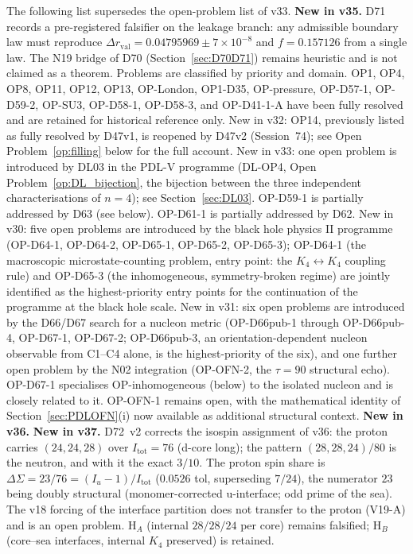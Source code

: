 \documentclass[11pt,a4paper]{article}
\theoremstyle{plain}
\theoremstyle{definition}
\theoremstyle{remark}
\begin{document}
The following list supersedes the open-problem list of v33. \textcolor{negativered}{\textbf{New in v35.}} D71 records a pre-registered falsifier on the leakage branch: any admissible boundary law must reproduce $\Delta r_{\mathrm{val}}=0.04795969\pm7\times10^{-8}$ and $f=0.157126$ from a single law. The N19 bridge of D70 (Section~\ref{sec:D70D71}) remains heuristic and is not claimed as a theorem. Problems are classified by priority and domain. OP1, OP4, OP8, OP11, OP12, OP13, OP-London, OP1-D35, OP-pressure, OP-D57-1, OP-D59-2, OP-SU3, OP-D58-1, OP-D58-3, and OP-D41-1-A have been fully resolved and are retained for historical reference only. \textcolor{negativered}{New in v32: OP14, previously listed as fully resolved by D47v1, is reopened by D47v2 (Session~74); see Open Problem~\ref{op:filling} below for the full account.} New in v33: one open problem is introduced by DL03 in the PDL-V programme (DL-OP4, Open Problem~\ref{op:DL_bijection}, the bijection between the three independent characterisations of $n=4$); see Section~\ref{sec:DL03}. OP-D59-1 is partially addressed by D63 (see below). OP-D61-1 is partially addressed by D62. New in v30: five open problems are introduced by the black hole physics II programme (OP-D64-1, OP-D64-2, OP-D65-1, OP-D65-2, OP-D65-3); OP-D64-1 (the macroscopic microstate-counting problem, entry point: the $K_4\leftrightarrow K_4$ coupling rule) and OP-D65-3 (the inhomogeneous, symmetry-broken regime) are jointly identified as the highest-priority entry points for the continuation of the programme at the black hole scale. New in v31: six open problems are introduced by the D66/D67 search for a nucleon metric (OP-D66pub-1 through OP-D66pub-4, OP-D67-1, OP-D67-2; OP-D66pub-3, an orientation-dependent nucleon observable from C1--C4 alone, is the highest-priority of the six), and one further open problem by the N02 integration (OP-OFN-2, the $\tau=90$ structural echo). OP-D67-1 specialises OP-inhomogeneous (below) to the isolated nucleon and is closely related to it. OP-OFN-1 remains open, with the mathematical identity of Section~\ref{sec:PDLOFN}(i) now available as additional structural context. \textcolor{negativered}{\textbf{New in v36.}} \textcolor{negativered}{\textbf{New in v37.}} D72~v2 corrects the isospin assignment of v36: the proton carries $(24,24,28)$ over $I_{\mathrm{tot}}=76$ (d-core long); the pattern $(28,28,24)/80$ is the neutron, and with it the exact $3/10$. The proton spin share is $\Delta\Sigma=23/76=(I_u-1)/I_{\mathrm{tot}}$ ($0.0526$ tol, superseding $7/24$), the numerator $23$ being doubly structural (monomer-corrected u-interface; odd prime of the sea). The v18 forcing of the interface partition does not transfer to the proton (V19-A) and is an open problem. H$_{A}$ (internal $28/28/24$ per core) remains falsified; H$_{B}$ (core--sea interfaces, internal $K_{4}$ preserved) is retained.
\end{document}
